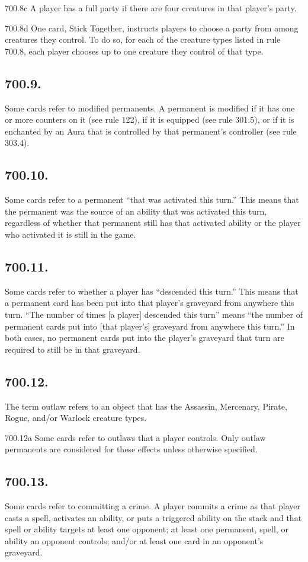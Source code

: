 700.8c A player has a full party if there are four creatures in that player’s party.

700.8d One card, Stick Together, instructs players to choose a party from among creatures they control. To do so, for each of the creature types listed in rule 700.8, each player chooses up to one creature they control of that type.

\subsection*{700.9.}
Some cards refer to modified permanents. A permanent is modified if it has one or more counters on it (see rule 122), if it is equipped (see rule 301.5), or if it is enchanted by an Aura that is controlled by that permanent’s controller (see rule 303.4).

\subsection*{700.10.}
Some cards refer to a permanent “that was activated this turn.” This means that the permanent was the source of an ability that was activated this turn, regardless of whether that permanent still has that activated ability or the player who activated it is still in the game.

\subsection*{700.11.}
Some cards refer to whether a player has “descended this turn.” This means that a permanent card has been put into that player’s graveyard from anywhere this turn. “The number of times [a player] descended this turn” means “the number of permanent cards put into [that player’s] graveyard from anywhere this turn.” In both cases, no permanent cards put into the player’s graveyard that turn are required to still be in that graveyard.

\subsection*{700.12.}
The term outlaw refers to an object that has the Assassin, Mercenary, Pirate, Rogue, and/or Warlock creature types.

700.12a Some cards refer to outlaws that a player controls. Only outlaw permanents are considered for these effects unless otherwise specified.

\subsection*{700.13.}
Some cards refer to committing a crime. A player commits a crime as that player casts a spell, activates an ability, or puts a triggered ability on the stack and that spell or ability targets at least one opponent; at least one permanent, spell, or ability an opponent controls; and/or at least one card in an opponent’s graveyard.

